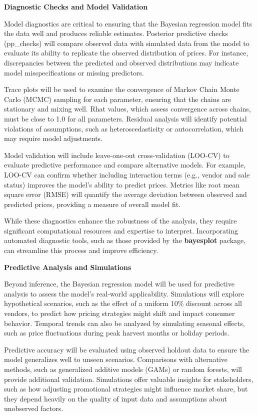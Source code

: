 \documentclass[
  letterpaper,
  DIV=11,
  numbers=noendperiod]{scrartcl}
\begin{document}
\textbf{Diagnostic Checks and Model Validation}

Model diagnostics are critical to ensuring that the Bayesian regression
model fits the data well and produces reliable estimates. Posterior
predictive checks (pp\_checks) will compare observed data with simulated
data from the model to evaluate its ability to replicate the observed
distribution of prices. For instance, discrepancies between the
predicted and observed distributions may indicate model
misspecifications or missing predictors.

Trace plots will be used to examine the convergence of Markov Chain
Monte Carlo (MCMC) sampling for each parameter, ensuring that the chains
are stationary and mixing well. Rhat values, which assess convergence
across chains, must be close to 1.0 for all parameters. Residual
analysis will identify potential violations of assumptions, such as
heteroscedasticity or autocorrelation, which may require model
adjustments.

Model validation will include leave-one-out cross-validation (LOO-CV) to
evaluate predictive performance and compare alternative models. For
example, LOO-CV can confirm whether including interaction terms (e.g.,
vendor and sale status) improves the model's ability to predict prices.
Metrics like root mean square error (RMSE) will quantify the average
deviation between observed and predicted prices, providing a measure of
overall model fit.

While these diagnostics enhance the robustness of the analysis, they
require significant computational resources and expertise to interpret.
Incorporating automated diagnostic tools, such as those provided by the
\textbf{bayesplot} package, can streamline this process and improve
efficiency.

\textbf{Predictive Analysis and Simulations}

Beyond inference, the Bayesian regression model will be used for
predictive analysis to assess the model's real-world applicability.
Simulations will explore hypothetical scenarios, such as the effect of a
uniform 10\% discount across all vendors, to predict how pricing
strategies might shift and impact consumer behavior. Temporal trends can
also be analyzed by simulating seasonal effects, such as price
fluctuations during peak harvest months or holiday periods.

Predictive accuracy will be evaluated using observed holdout data to
ensure the model generalizes well to unseen scenarios. Comparisons with
alternative methods, such as generalized additive models (GAMs) or
random forests, will provide additional validation. Simulations offer
valuable insights for stakeholders, such as how adjusting promotional
strategies might influence market share, but they depend heavily on the
quality of input data and assumptions about unobserved factors.
\end{document}
